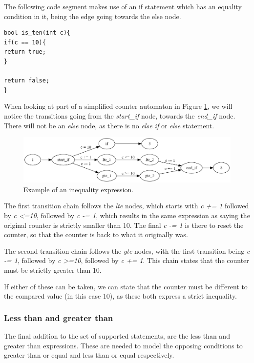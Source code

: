 \documentclass[12pt]{article}
\begin{document}
The following code segment makes use of an if statement which has an equality condition in it, being the edge going towards the else node.

\begin{lstlisting}[style=CStyle]
bool is_ten(int c){
if(c == 10){
return true;
}

return false;
}
\end{lstlisting}

When looking at part of a simplified counter automaton in Figure \ref{fig:inequality_expression}, we will notice the transitions going from the \textit{start\_if} node, towards the \textit{end\_if} node. There will not be an \textit{else} node, as there is no \textit{else if} or \textit{else} statement.

\begin{figure}[h]
	\centering
	\includegraphics[width=\linewidth]{inequality_expression}
	\caption{Example of an inequality expression.}
	\label{fig:inequality_expression}
\end{figure}

The first transition chain follows the \textit{lte} nodes, which starts with \textit{c += 1} followed by \textit{c \textless =10}, followed by \textit{c -= 1}, which results in the same expression as saying the original counter is strictly smaller than 10. The final \textit{c -= 1} is there to reset the counter, so that the counter is back to what it originally was. 

The second transition chain follows the \textit{gte} nodes, with the first transition being \textit{c -= 1}, followed by \textit{c \textgreater =10}, followed by \textit{c += 1}. This chain states that the counter must be strictly greater than 10.

If either of these can be taken, we can state that the counter must be different to the compared value (in this case 10), as these both express a strict inequality. 

\subsubsection{Less than and greater than}
\label{sec:strict}
The final addition to the set of supported statements, are the less than and greater than expressions. These are needed to model the opposing conditions to greater than or equal and less than or equal respectively.
\end{document}

